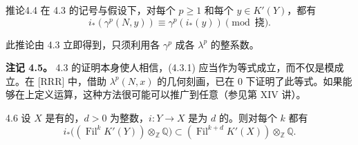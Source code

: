 \begin{SGAresult}{推论}{4.4}
在 4.3 的记号与假设下，对每个 $p\geq1$ 和每个 $y\in K'(Y)$，都有
\[
i_*(\gamma^p(N,y))\equiv\gamma^p(i_*(y))\pmod{\text{挠}}.
\]
\end{SGAresult}
此推论由 4.3 立即得到，只须利用各 $\gamma^p$ 成各 $\lambda^p$ 的整系数。

\textbf{注记 4.5。} 4.3 的证明本身使人相信，(4.3.1) 应当作为等式成立，而不仅是模成立。在 [RRR] 中，借助 $\lambda^p(N,x)$ 的几何刻画，已在 $0$ 下证明了此等式。如果能够在上定义运算，这种方法很可能可以推广到任意（参见第 XIV 讲）。

\begin{SGAresult}{}{4.6}
设 $X$ 是有的，$d>0$ 为整数，$i:Y\to X$ 是为 $d$ 的。则对每个 $k$ 都有
\[
i_*\bigl((\operatorname{Fil}^kK'(Y))\otimes_{\mathbb Z}\mathbb Q\bigr)
\subset(\operatorname{Fil}^{k+d}K'(X))\otimes_{\mathbb Z}\mathbb Q.
\]
\end{SGAresult}
